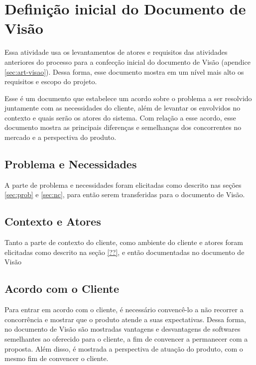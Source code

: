 \section{Definição inicial do Documento de Visão}
\label{sec:visao}

Essa atividade usa os levantamentos de atores e requisitos das atividades anteriores do processo para a confecção inicial do documento de Visão (apendice \ref{sec:art-visao}). Dessa forma, esse documento mostra em um nível mais alto os requisitos e escopo do projeto.

Esse é um documento que estabelece um acordo sobre o problema a ser resolvido juntamente com as necessidades do cliente, além de levantar os envolvidos no contexto e quais serão os atores do sistema. Com relação a esse acordo, esse documento mostra as principais diferenças e semelhanças dos concorrentes no mercado e a perspectiva do produto.

\subsection{Problema e Necessidades}
A parte de problema e necessidades foram elicitadas como descrito nas seções \ref{sec:prob} e \ref{sec:nc}, para então serem transferidas para o documento de Visão.

\subsection{Contexto e Atores}
Tanto a parte de contexto do cliente, como ambiente do cliente e atores foram elicitadas como descrito na seção \ref{??}, e então documentadas no documento de Visão

\subsection{Acordo com o Cliente}
Para entrar em acordo com o cliente, é necessário convencê-lo a não recorrer a concorrência e mostrar que o produto atende a suas expectativas. Dessa forma, no documento de Visão são mostradas vantagens e desvantagens de softwares semelhantes ao oferecido para o cliente, a fim de convencer a permanecer com a proposta. Além disso, é mostrada a perspectiva de atuação do produto, com o mesmo fim de convencer o cliente.

